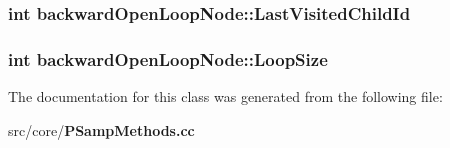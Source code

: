 \subsubsection{\setlength{\rightskip}{0pt plus 5cm}int {\bf backward\-Open\-Loop\-Node::Last\-Visited\-Child\-Id}}\label{classbackwardOpenLoopNode_dae81bb87767b0eddd48f9d8c12d76b8}


\subsubsection{\setlength{\rightskip}{0pt plus 5cm}int {\bf backward\-Open\-Loop\-Node::Loop\-Size}}\label{classbackwardOpenLoopNode_6a51efb0ce1661c4a36f7e752c023c3d}




The documentation for this class was generated from the following file:\begin{CompactItemize}
\item 
src/core/{\bf PSamp\-Methods.cc}\end{CompactItemize}
